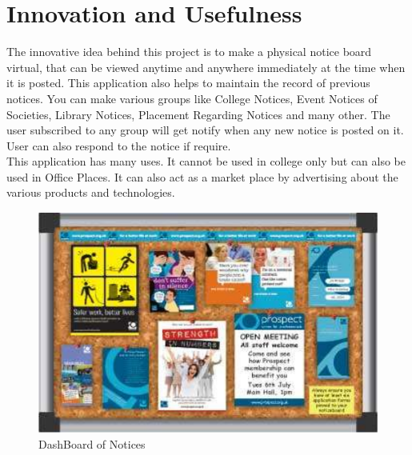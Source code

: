 
\section{Innovation and Usefulness}
The innovative idea behind this project is to make a physical notice board virtual, that can be
viewed anytime and anywhere immediately at the time when it is posted. This application also
helps to maintain the record of previous notices. You can make various groups like College
Notices, Event Notices of Societies, Library Notices, Placement Regarding Notices and many
other. The user subscribed to any group will get notify when any new notice is posted on it. User
can also respond to the notice if require.\\ 
This application has many uses. It cannot be used in college only but can also be used in Office
Places. It can also act as a market place by advertising about the various products and
technologies.

\begin{figure}[H]
\centering \includegraphics[scale=0.5]{image/notice.png}
\caption{DashBoard of Notices}
\end{figure}
